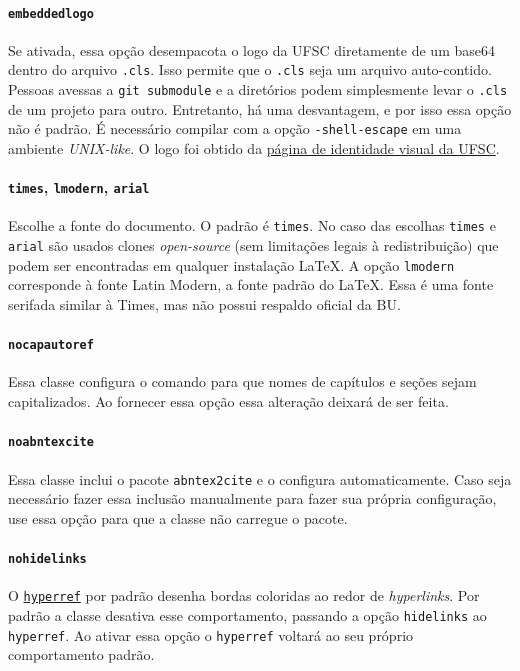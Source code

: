 \documentclass[embeddedlogo]{../ufsc-thesis-rn46-2019}
\begin{document}
\paragraph*{\texttt{embeddedlogo}} Se ativada, essa opção desempacota o logo da
UFSC diretamente de um base64 dentro do arquivo \texttt{.cls}. Isso permite que
o \texttt{.cls} seja um arquivo auto-contido. Pessoas avessas a \texttt{git
submodule} e a diretórios podem simplesmente levar o \texttt{.cls} de um
projeto para outro. Entretanto, há uma desvantagem, e por isso essa opção não é
padrão. É necessário compilar com a opção \texttt{-shell-escape} em uma
ambiente \emph{UNIX-like}. O logo foi obtido da \href{http://identidade.ufsc.br/}{página de identidade
visual da UFSC}.

\paragraph*{\texttt{times}, \texttt{lmodern}, \texttt{arial}} Escolhe a fonte
do documento. O padrão é \texttt{times}. No caso das escolhas \texttt{times} e
\texttt{arial} são usados clones \emph{open-source} (sem limitações legais à
redistribuição) que podem ser encontradas em qualquer instalação \LaTeX. A
opção \texttt{lmodern} corresponde à fonte Latin Modern, a fonte padrão do
\LaTeX. Essa é uma fonte serifada similar à Times, mas não possui respaldo
oficial da BU.

\paragraph*{\texttt{nocapautoref}} Essa classe configura o comando
\mt{\autoref} para que nomes de capítulos e seções sejam capitalizados. Ao
fornecer essa opção essa alteração deixará de ser feita.

\paragraph*{\texttt{noabntexcite}} Essa classe inclui o pacote
\texttt{abntex2cite} e o configura automaticamente. Caso seja necessário fazer
essa inclusão manualmente para fazer sua própria configuração, use essa opção
para que a classe não carregue o pacote.

\paragraph*{\texttt{nohidelinks}} O
\href{https://ctan.org/pkg/hyperref}{\texttt{hyperref}} por padrão desenha
bordas coloridas ao redor de \emph{hyperlinks}. Por padrão a classe desativa
esse comportamento, passando a opção \texttt{hidelinks} ao \texttt{hyperref}.
Ao ativar essa opção o \texttt{hyperref} voltará ao seu próprio comportamento
padrão.
\end{document}
